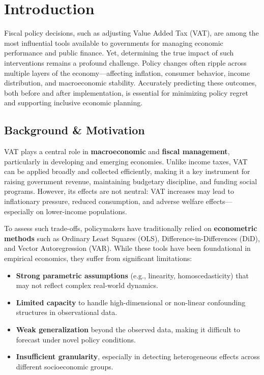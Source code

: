 \section{Introduction}\label{sec:intro}

Fiscal policy decisions, such as adjusting Value Added Tax (VAT), are among the most influential tools available to governments for managing economic performance and public finance. Yet, determining the true impact of such interventions remains a profound challenge. Policy changes often ripple across multiple layers of the economy---affecting inflation, consumer behavior, income distribution, and macroeconomic stability. Accurately predicting these outcomes, both before and after implementation, is essential for minimizing policy regret and supporting inclusive economic planning.

\subsection{Background \& Motivation}\label{subsec:background}

VAT plays a central role in \textbf{macroeconomic} and \textbf{fiscal management}, particularly in developing and emerging economies. Unlike income taxes, VAT can be applied broadly and collected efficiently, making it a key instrument for raising government revenue, maintaining budgetary discipline, and funding social programs. However, its effects are not neutral: VAT increases may lead to inflationary pressure, reduced consumption, and adverse welfare effects---especially on lower-income populations.

To assess such trade-offs, policymakers have traditionally relied on \textbf{econometric methods} such as Ordinary Least Squares (OLS), Difference-in-Differences (DiD), and Vector Autoregression (VAR). While these tools have been foundational in empirical economics, they suffer from significant limitations:

\begin{itemize}
    \item \textbf{Strong parametric assumptions} (e.g., linearity, homoscedasticity) that may not reflect complex real-world dynamics.
    \item \textbf{Limited capacity} to handle high-dimensional or non-linear confounding structures in observational data.
    \item \textbf{Weak generalization} beyond the observed data, making it difficult to forecast under novel policy conditions.
    \item \textbf{Insufficient granularity}, especially in detecting heterogeneous effects across different socioeconomic groups.
\end{itemize}

